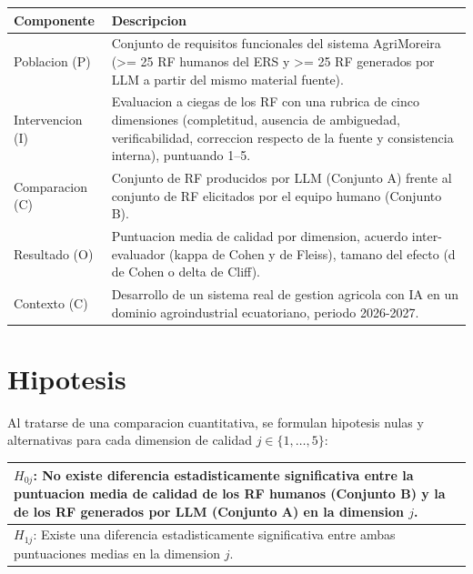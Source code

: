 \documentclass[12pt,a4paper]{article}
\begin{document}
\begin{center}
\begin{tabular}{>{\raggedright\arraybackslash}p{3cm} p{12cm}}
\toprule
\textbf{Componente} & \textbf{Descripcion} \\
\midrule
Poblacion (P) & Conjunto de requisitos funcionales del sistema AgriMoreira
(>= 25 RF humanos del ERS y >= 25 RF generados por LLM a partir del mismo
material fuente). \\
Intervencion (I) & Evaluacion a ciegas de los RF con una rubrica de cinco
dimensiones (completitud, ausencia de ambiguedad, verificabilidad, correccion
respecto de la fuente y consistencia interna), puntuando 1--5. \\
Comparacion (C) & Conjunto de RF producidos por LLM (Conjunto A) frente al
conjunto de RF elicitados por el equipo humano (Conjunto B). \\
Resultado (O) & Puntuacion media de calidad por dimension, acuerdo
inter-evaluador (kappa de Cohen y de Fleiss), tamano del efecto (d de Cohen o
delta de Cliff). \\
Contexto (C) & Desarrollo de un sistema real de gestion agricola con IA en un
dominio agroindustrial ecuatoriano, periodo 2026-2027. \\
\bottomrule
\end{tabular}
\end{center}

\section{Hipotesis}

Al tratarse de una comparacion cuantitativa, se formulan hipotesis nulas y
alternativas para cada dimension de calidad \(j \in \{1, \ldots, 5\}\):

\begin{center}
\begin{tabular}{p{13cm}}
\hline
\(H_{0j}\): No existe diferencia estadisticamente significativa entre la
puntuacion media de calidad de los RF humanos (Conjunto B) y la de los RF
generados por LLM (Conjunto A) en la dimension \(j\). \\
\hline
\(H_{1j}\): Existe una diferencia estadisticamente significativa entre ambas
puntuaciones medias en la dimension \(j\). \\
\hline
\end{tabular}
\end{center}
\end{document}
